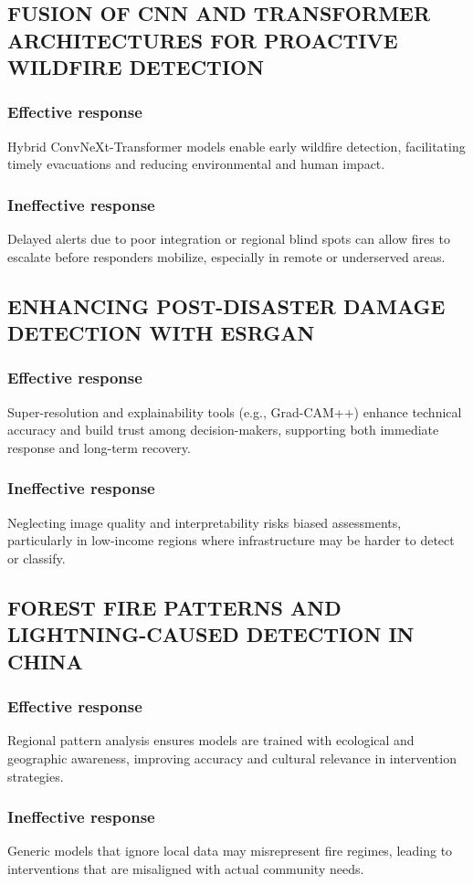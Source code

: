 \documentclass{beamer}
\begin{document}
{\subsection{FUSION OF CNN AND TRANSFORMER ARCHITECTURES FOR PROACTIVE WILDFIRE DETECTION}
\subsubsection{Effective response}
Hybrid ConvNeXt-Transformer models enable early wildfire detection, facilitating timely evacuations and reducing environmental and human impact.
\subsubsection{Ineffective response}
Delayed alerts due to poor integration or regional blind spots can allow fires to escalate before responders mobilize, especially in remote or underserved areas.
\subsection{ENHANCING POST-DISASTER DAMAGE DETECTION WITH ESRGAN}
\subsubsection{Effective response}
Super-resolution and explainability tools (e.g., Grad-CAM++) enhance technical accuracy and build trust among decision-makers, supporting both immediate response and long-term recovery.
\subsubsection{Ineffective response}
Neglecting image quality and interpretability risks biased assessments, particularly in low-income regions where infrastructure may be harder to detect or classify.
\subsection{FOREST FIRE PATTERNS AND LIGHTNING-CAUSED DETECTION IN CHINA}
\subsubsection{Effective response}
Regional pattern analysis ensures models are trained with ecological and geographic awareness, improving accuracy and cultural relevance in intervention strategies.
\subsubsection{Ineffective response}
Generic models that ignore local data may misrepresent fire regimes, leading to interventions that are misaligned with actual community needs.
}
\end{document}
